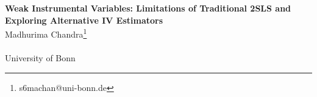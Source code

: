 \documentclass[12pt, a4paper]{article}
\begin{document}
\baselineskip=18pt
\thispagestyle{empty}

\begin{center}
{\Large {\bf Weak Instrumental Variables:  Limitations of Traditional 2SLS and  Exploring Alternative IV Estimators}}\\
\vspace{1.75cm} {\large Madhurima Chandra}\footnote{s6machan@uni-bonn.de}\\
\vspace{0.75cm}{\large Research Module in Econometrics and Statistics 2019-20}
\vspace{0.15cm}\\{\large University of Bonn}
\vspace{0.75cm}\\
\begin{abstract}
    This paper delves into theoretical aspects of weak instrumental variables. We present the problems the two-stage least squares instrumental variables estimator runs into in presence of weak instruments, rendering our estimates biased. We take a deeper look at defining and testing for weakness of instruments. We then present two alternative estimators which are partially robust with weak instruments.
\end{abstract}
\end{center}


\newpage
\thispagestyle{empty}
\setcounter{tocdepth}{3}
\tableofcontents
\newpage







\newpage


%


\end{document}
